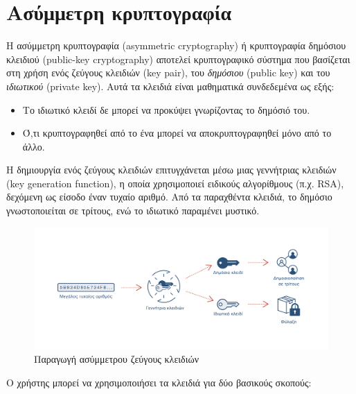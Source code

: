 \section{Ασύμμετρη κρυπτογραφία} \label{section:2-2-asymmetric-cryptography}

Η ασύμμετρη κρυπτογραφία (asymmetric cryptography) ή κρυπτογραφία δημόσιου κλειδιού (public-key cryptography) αποτελεί κρυπτογραφικό σύστημα που βασίζεται στη χρήση ενός ζεύγους κλειδιών (key pair), του \textit{δημόσιου} (public key) και του \textit{ιδιωτικού} (private key). Αυτά τα κλειδιά είναι μαθηματικά συνδεδεμένα ως εξής:

\begin{itemize}
	\item Το ιδιωτικό κλειδί δε μπορεί να προκύψει γνωρίζοντας το δημόσιό του.
	\item Ό,τι κρυπτογραφηθεί από το ένα μπορεί να αποκρυπτογραφηθεί μόνο από το άλλο.
\end{itemize}
	
Η δημιουργία ενός ζεύγους κλειδιών επιτυγχάνεται μέσω μιας γεννήτριας κλειδιών (\textenglish{key generation function}), η οποία χρησιμοποιεί ειδικούς αλγορίθμους (π.χ. RSA), δεχόμενη ως είσοδο έναν τυχαίο αριθμό. Από τα παραχθέντα κλειδιά, το δημόσιο γνωστοποιείται σε τρίτους, ενώ το ιδιωτικό παραμένει μυστικό.

\begin{figure}[H]
	\centering
	\includegraphics[width=.95\textwidth]{assets/figures/chapter-2/2.2.asymmetric-key-generation}
	\caption{Παραγωγή ασύμμετρου ζεύγους κλειδιών}
\end{figure}

Ο χρήστης μπορεί να χρησιμοποιήσει τα κλειδιά για δύο βασικούς σκοπούς:

